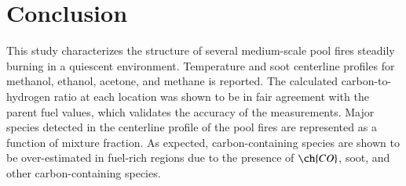 \documentclass[preprint,review,12pt]{elsarticle}
\begin{document}
\section{Conclusion}
\label{sec:Conclusion}
This study characterizes the structure of several medium-scale pool fires steadily burning in a quiescent environment. Temperature and soot centerline profiles for methanol, ethanol, acetone, and methane is reported. The calculated carbon-to-hydrogen ratio at each location was shown to be in fair agreement with the parent fuel values, which validates the accuracy of the measurements. Major species detected in the centerline profile of the pool fires are represented as a function of mixture fraction. As expected, carbon-containing species are shown to be over-estimated in fuel-rich regions due to the presence of $\ch{CO}$, soot, and other carbon-containing species.



\end{document}

